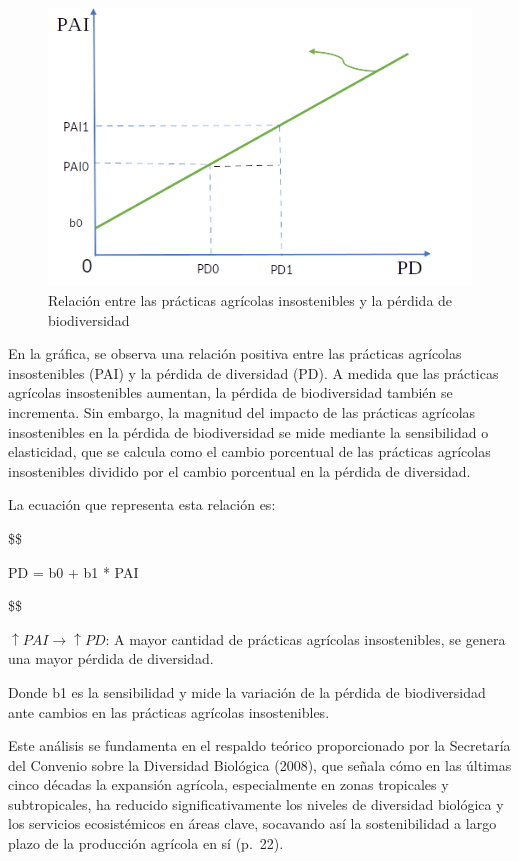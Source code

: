 \documentclass[
  a4paper,
]{article}
\begin{document}
\begin{figure}

\caption{\label{fig-1}Relación entre las prácticas agrícolas
insostenibles y la pérdida de biodiversidad}

{\centering \includegraphics{20230603001915.png}

}

\end{figure}

En la gráfica, se observa una relación positiva entre las prácticas
agrícolas insostenibles (PAI) y la pérdida de diversidad (PD). A medida
que las prácticas agrícolas insostenibles aumentan, la pérdida de
biodiversidad también se incrementa. Sin embargo, la magnitud del
impacto de las prácticas agrícolas insostenibles en la pérdida de
biodiversidad se mide mediante la sensibilidad o elasticidad, que se
calcula como el cambio porcentual de las prácticas agrícolas
insostenibles dividido por el cambio porcentual en la pérdida de
diversidad.

La ecuación que representa esta relación es:

\$\$

PD = b0 + b1 * PAI

\$\$

\(↑PAI → ↑PD\): A mayor cantidad de prácticas agrícolas insostenibles,
se genera una mayor pérdida de diversidad.

Donde b1 es la sensibilidad y mide la variación de la pérdida de
biodiversidad ante cambios en las prácticas agrícolas insostenibles.

Este análisis se fundamenta en el respaldo teórico proporcionado por la
Secretaría del Convenio sobre la Diversidad Biológica (2008), que señala
cómo en las últimas cinco décadas la expansión agrícola, especialmente
en zonas tropicales y subtropicales, ha reducido significativamente los
niveles de diversidad biológica y los servicios ecosistémicos en áreas
clave, socavando así la sostenibilidad a largo plazo de la producción
agrícola en sí (p.~22).
\end{document}
